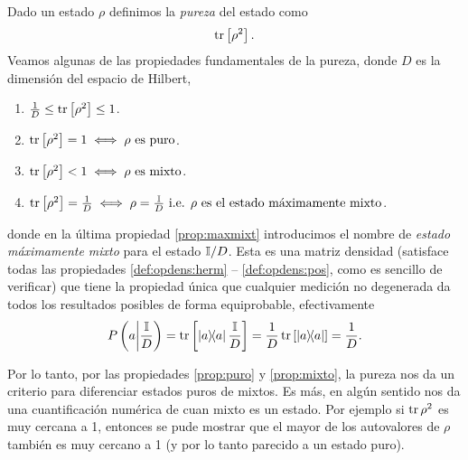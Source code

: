 \documentclass[10pt, a4paper]{article}
\numberwithin{equation}{subsection}
\begin{document}
\bigbreak

Dado un estado $\rho$ definimos la \emph{pureza} del estado como
\begin{equation} \label{def:pureza}
  \tr\left[\rho^2\right].
\end{equation}
Veamos algunas de las propiedades fundamentales de la pureza, donde $D$ es la
dimensión del espacio de Hilbert,
\begin{enumerate}[label=(\alph*)]
  \item $\frac{1}{D} \leq \tr\left[\rho^2\right] \leq 1$.
  \item $\tr\left[\rho^2\right] = 1 \iff \rho\text{ es puro}$.
    \label{prop:puro}
  \item $\tr\left[\rho^2\right] < 1 \iff \rho\text{ es mixto}$.
    \label{prop:mixto}
  \item $\tr\left[\rho^2\right] = \frac{1}{D} \iff \rho = \frac{\mathbb{I}}{D} \text{
      i.e. } \rho\text{ es el estado máximamente mixto}$. \label{prop:maxmixt}
\end{enumerate}
donde en la última propiedad \ref{prop:maxmixt} introducimos el nombre de
\emph{estado máximamente mixto} para el estado $\mathbb{I}/D$. Esta es una matriz
densidad (satisface todas las propiedades \eqref{def:opdens:herm} --
\eqref{def:opdens:pos}, como es sencillo de verificar) que tiene la propiedad
única que cualquier medición no degenerada da todos los resultados posibles de
forma equiprobable, efectivamente
\begin{equation}
  \ProbCond{a}{\frac{\Id}{D}} = \tr\left[\projector{a}\frac{\Id}{D}\right] =
    \frac{1}{D}\tr\left[\projector{a}\right] = \frac{1}{D}.
\end{equation}

Por lo tanto, por las propiedades \ref{prop:puro} y \ref{prop:mixto}, la pureza
nos da un criterio para diferenciar estados puros de mixtos. Es más, en algún
sentido nos da una cuantificación numérica de cuan mixto es un estado. Por
ejemplo si $\tr\rho^2$ es muy cercana a 1, entonces se pude mostrar que el
mayor de los autovalores de $\rho$ también es muy cercano a 1 (y por lo tanto
parecido a un estado puro).

\bigbreak

\end{document}
